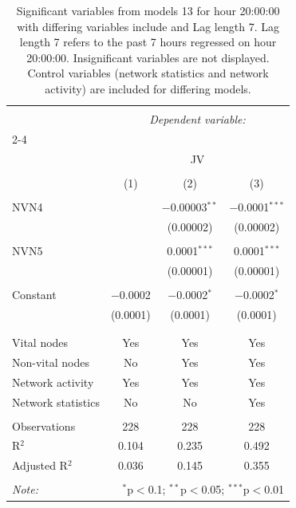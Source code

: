 
\begin{table}[!htbp] \centering 
  \caption{Significant variables from models 13 for hour 20:00:00 with differing variables include 
                               and Lag length 7. Lag length 7 refers to the past 7 hours regressed on hour 20:00:00. 
                               Insignificant variables are not displayed. 
                               Control variables (network statistics and network activity) are 
                               included for differing models.} 
  \label{Jmodels2_t_hourlagged7} 
\scriptsize 
\begin{tabular}{@{\extracolsep{5pt}}lccc} 
\\[-1.8ex]\hline 
\hline \\[-1.8ex] 
 & \multicolumn{3}{c}{\textit{Dependent variable:}} \\ 
\cline{2-4} 
\\[-1.8ex] & \multicolumn{3}{c}{JV} \\ 
\\[-1.8ex] & (1) & (2) & (3)\\ 
\hline \\[-1.8ex] 
 NVN4 &  & $-$0.00003$^{**}$ & $-$0.0001$^{***}$ \\ 
  &  & (0.00002) & (0.00002) \\ 
  & & & \\ 
 NVN5 &  & 0.0001$^{***}$ & 0.0001$^{***}$ \\ 
  &  & (0.00001) & (0.00001) \\ 
  & & & \\ 
 Constant & $-$0.0002 & $-$0.0002$^{*}$ & $-$0.0002$^{*}$ \\ 
  & (0.0001) & (0.0001) & (0.0001) \\ 
  & & & \\ 
\hline \\[-1.8ex] 
Vital nodes & Yes & Yes & Yes \\ 
Non-vital nodes & No & Yes & Yes \\ 
Network activity & Yes & Yes & Yes \\ 
Network statistics & No & No & Yes \\ 
\hline &  &  &  \\ 
Observations & 228 & 228 & 228 \\ 
R$^{2}$ & 0.104 & 0.235 & 0.492 \\ 
Adjusted R$^{2}$ & 0.036 & 0.145 & 0.355 \\ 
\hline 
\hline \\[-1.8ex] 
\textit{Note:}  & \multicolumn{3}{r}{$^{*}$p$<$0.1; $^{**}$p$<$0.05; $^{***}$p$<$0.01} \\ 
\end{tabular} 
\end{table} 
